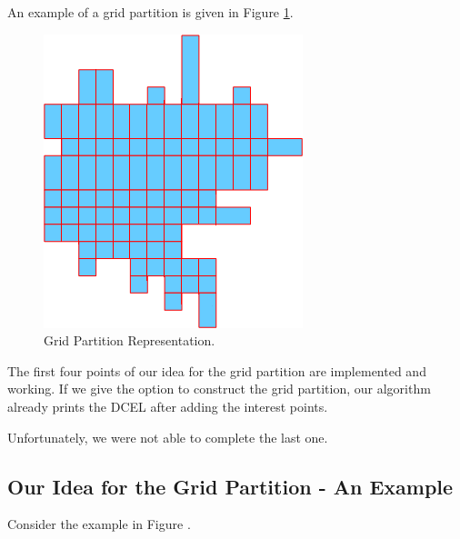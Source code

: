 \documentclass[12pt,a4paper,oneside]{article}
\begin{document}
An example of a grid partition is given in Figure \ref{fig:grid}.

\begin{figure}[h!]
  \centering \includegraphics[scale=0.5]{gridPartition.png}
  \caption{Grid Partition Representation.}
  \label{fig:grid}
\end{figure}

The first four points of our idea for the grid partition are implemented and working. If we give the option to construct the grid partition, our algorithm already prints the DCEL after adding the interest points.

Unfortunately, we were not able to complete the last one.

\subsection{Our Idea for the Grid Partition - An Example}\label{subsec:gridex}

Consider the example in Figure . %
\end{document}
